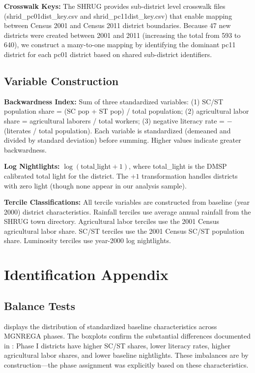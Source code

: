 \documentclass[12pt]{article}
\begin{document}
\textbf{Crosswalk Keys:} The SHRUG provides sub-district level crosswalk files (shrid\_pc01dist\_key.csv and shrid\_pc11dist\_key.csv) that enable mapping between Census 2001 and Census 2011 district boundaries. Because 47 new districts were created between 2001 and 2011 (increasing the total from 593 to 640), we construct a many-to-one mapping by identifying the dominant pc11 district for each pc01 district based on shared sub-district identifiers.

\subsection{Variable Construction}

\textbf{Backwardness Index:} Sum of three standardized variables: (1) SC/ST population share = (SC pop + ST pop) / total population; (2) agricultural labor share = agricultural laborers / total workers; (3) negative literacy rate = $-$(literates / total population). Each variable is standardized (demeaned and divided by standard deviation) before summing. Higher values indicate greater backwardness.

\textbf{Log Nightlights:} $\log(\text{total\_light} + 1)$, where total\_light is the DMSP calibrated total light for the district. The $+1$ transformation handles districts with zero light (though none appear in our analysis sample).

\textbf{Tercile Classifications:} All tercile variables are constructed from baseline (year 2000) district characteristics. Rainfall terciles use average annual rainfall from the SHRUG town directory. Agricultural labor terciles use the 2001 Census agricultural labor share. SC/ST terciles use the 2001 Census SC/ST population share. Luminosity terciles use year-2000 log nightlights.


\section{Identification Appendix}
\label{app:identification}

\subsection{Balance Tests}

 displays the distribution of standardized baseline characteristics across MGNREGA phases. The boxplots confirm the substantial differences documented in : Phase I districts have higher SC/ST shares, lower literacy rates, higher agricultural labor shares, and lower baseline nightlights. These imbalances are by construction---the phase assignment was explicitly based on these characteristics.
\end{document}
